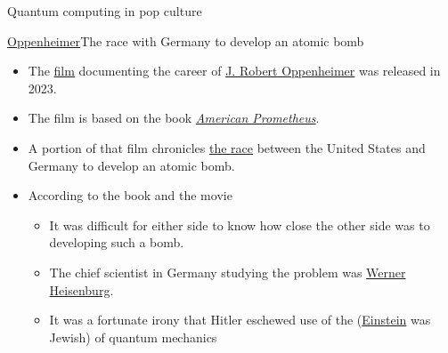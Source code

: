 \begin{frame}{Quantum computing in pop culture}{}
%
%
\end{frame}

\begin{frame}{\href{https://en.wikipedia.org/wiki/Oppenheimer\_(film)}{Oppenheimer}}{The race with Germany to develop an atomic bomb}
\begin{itemize}
    \item The \href{https://en.wikipedia.org/wiki/Oppenheimer_(film)}{film} documenting the career of \href{https://en.wikipedia.org/wiki/J.\_Robert\_Oppenheimer}{J. Robert Oppenheimer} was released in 2023.
    \item The film is based on the book \href{https://en.wikipedia.org/wiki/American\_Prometheus}{\textit{American Prometheus}}.
    \item A portion of that film chronicles \href{https://www.osti.gov/opennet/manhattan-project-history/Events/1942-1945/rivals.htm}{the race} between the United States and Germany to develop an atomic bomb.
    \item According to the book and the movie
    \begin{itemize}
        \item It was difficult for either side to know how close the other side was to developing such a bomb.
        \item The chief scientist in Germany studying the problem was \href{https://en.wikipedia.org/wiki/Werner\_Heisenberg}{Werner Heisenburg}.
        \item It was a fortunate irony that Hitler eschewed use of the  (\href{https://en.wikipedia.org/wiki/Albert_Einstein}{Einstein} was Jewish) of quantum mechanics 
    \end{itemize}
\end{itemize}
\end{frame}


